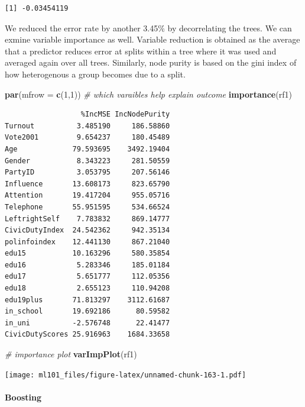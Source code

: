 \documentclass[]{article}
\newenvironment{Shaded}{\begin{snugshade}}{\end{snugshade}}
\newcommand{\CommentTok}[1]{\textcolor[rgb]{0.56,0.35,0.01}{\textit{#1}}}
\newcommand{\DataTypeTok}[1]{\textcolor[rgb]{0.13,0.29,0.53}{#1}}
\newcommand{\DecValTok}[1]{\textcolor[rgb]{0.00,0.00,0.81}{#1}}
\newcommand{\KeywordTok}[1]{\textcolor[rgb]{0.13,0.29,0.53}{\textbf{#1}}}
\newcommand{\NormalTok}[1]{#1}
\let\oldparagraph\paragraph
\renewcommand{\paragraph}[1]{\oldparagraph{#1}\mbox{}}
\begin{document}
\begin{verbatim}
[1] -0.03454119
\end{verbatim}

We reduced the error rate by another 3.45\(\%\) by decorrelating the trees. We can exmine variable importance as well. Variable reduction is obtained as the average that a predictor reduces error at splits within a tree where it was used and averaged again over all trees. Similarly, node purity is based on the gini index of how heterogenous a group becomes due to a split.

\begin{Shaded}
\begin{Highlighting}[]
\KeywordTok{par}\NormalTok{(}\DataTypeTok{mfrow =} \KeywordTok{c}\NormalTok{(}\DecValTok{1}\NormalTok{,}\DecValTok{1}\NormalTok{))}
\CommentTok{# which varaibles help explain outcome}
\KeywordTok{importance}\NormalTok{(rf1)}
\end{Highlighting}
\end{Shaded}

\begin{verbatim}
                  %IncMSE IncNodePurity
Turnout          3.485190     186.58860
Vote2001         9.654237     180.45489
Age             79.593695    3492.19404
Gender           8.343223     281.50559
PartyID          3.053795     207.56146
Influence       13.608173     823.65790
Attention       19.417204     955.05716
Telephone       55.951595     534.66524
LeftrightSelf    7.783832     869.14777
CivicDutyIndex  24.542362     942.35134
polinfoindex    12.441130     867.21040
edu15           10.163296     580.35854
edu16            5.283346     185.01184
edu17            5.651777     112.05356
edu18            2.655123     110.94208
edu19plus       71.813297    3112.61687
in_school       19.692186      80.59582
in_uni          -2.576748      22.41477
CivicDutyScores 25.916963    1684.33658
\end{verbatim}

\begin{Shaded}
\begin{Highlighting}[]
\CommentTok{# importance plot}
\KeywordTok{varImpPlot}\NormalTok{(rf1)}
\end{Highlighting}
\end{Shaded}

\texttt{[image: ml101\_files/figure-latex/unnamed-chunk-163-1.pdf]}

\hypertarget{boosting}{%
\paragraph{Boosting}\label{boosting}}
\end{document}
